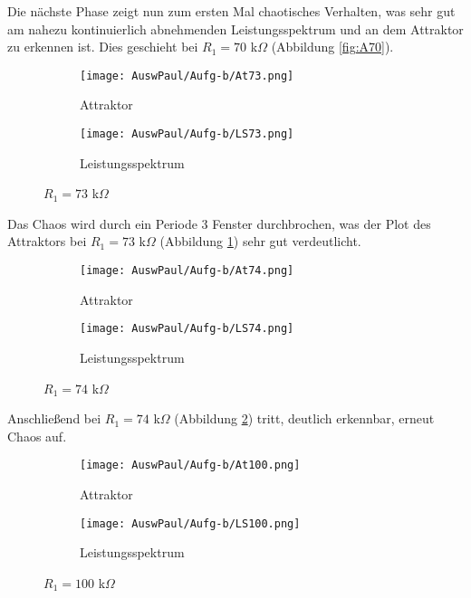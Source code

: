 Die nächste Phase zeigt nun zum ersten Mal chaotisches Verhalten, was sehr gut am nahezu kontinuierlich abnehmenden Leistungsspektrum und an dem Attraktor zu erkennen ist. Dies geschieht bei $R_1 = 70$ k$\Omega$ (Abbildung \ref{fig:A70}).

\begin{figure}[h]
    \centering
    \begin{subfigure}[b]{0.45\textwidth}
        \centering
        \texttt{[image: AuswPaul/Aufg-b/At73.png]}
        \caption{Attraktor}
    \end{subfigure}
    \hfill
    \begin{subfigure}[b]{0.45\textwidth}
        \centering
        \texttt{[image: AuswPaul/Aufg-b/LS73.png]}
        \caption{Leistungsspektrum}
    \end{subfigure}
    \caption{$R_1 = 73$ k$\Omega$}
    \label{fig:A73}
\end{figure}

Das Chaos wird durch ein Periode 3 Fenster durchbrochen, was der Plot des Attraktors bei $R_1 = 73$ k$\Omega$ (Abbildung \ref{fig:A73}) sehr gut verdeutlicht.

\begin{figure}[h]
    \centering
    \begin{subfigure}[b]{0.45\textwidth}
        \centering
        \texttt{[image: AuswPaul/Aufg-b/At74.png]}
        \caption{Attraktor}
    \end{subfigure}
    \hfill
    \begin{subfigure}[b]{0.45\textwidth}
        \centering
        \texttt{[image: AuswPaul/Aufg-b/LS74.png]}
        \caption{Leistungsspektrum}
    \end{subfigure}
    \caption{$R_1 = 74$ k$\Omega$}
    \label{fig:A74}
\end{figure}

\newpage
Anschließend bei $R_1 = 74$ k$\Omega$ (Abbildung \ref{fig:A74}) tritt, deutlich erkennbar, erneut Chaos auf.

\begin{figure}[h]
    \centering
    \begin{subfigure}[b]{0.45\textwidth}
        \centering
        \texttt{[image: AuswPaul/Aufg-b/At100.png]}
        \caption{Attraktor}
    \end{subfigure}
    \hfill
    \begin{subfigure}[b]{0.45\textwidth}
        \centering
        \texttt{[image: AuswPaul/Aufg-b/LS100.png]}
        \caption{Leistungsspektrum}
    \end{subfigure}
    \caption{$R_1 = 100$ k$\Omega$}
    \label{fig:A100}
\end{figure}

